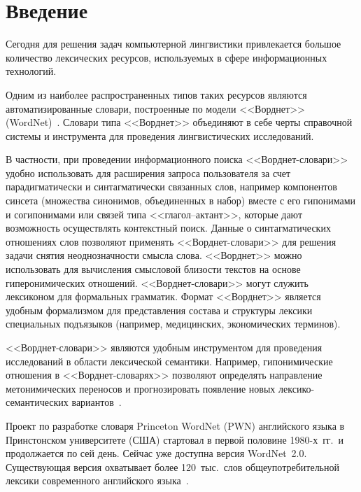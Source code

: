       \begin{multicols}{2}

      \label{st\stat}

\section{Введение}
     
     Сегодня для решения задач компьютерной лингвистики привлекается 
большое количество лексических ресурсов, используемых в сфере 
информационных технологий.
     
     Одним из наиболее распространенных типов таких ресурсов являются 
автоматизированные словари, построенные по модели <<Ворднет>> (WordNet)~\cite{1koz}. 
Словари типа <<Ворднет>> объединяют в себе черты справочной 
системы и инструмента для проведения лингвистических исследований.
     
     В частности, при проведении информационного поиска 
     <<Ворд\-нет-сло\-ва\-ри>> удобно использовать для расширения запроса 
пользователя за счет парадигматически и синтагматически связанных слов, 
например компонентов синсета (множества синонимов, объединенных в набор) 
вместе с его гипо\-ни\-ма\-ми и согипонимами или %
связей типа <<гла\-гол--ак\-тант>>, 
которые дают возможность осуществлять контекстный поиск. Данные о 
синтагматических отношениях слов позволяют применять 
     <<Ворд\-нет-сло\-ва\-ри>> для решения %
     задачи снятия неоднозначности 
смысла слова. <<Ворднет>> можно использовать для вычисления смысловой 
близости текстов на основе гиперонимических отношений. 
     <<Ворд\-нет-сло\-ва\-ри>> могут служить лексиконом для формальных 
грамматик. Формат <<Ворднет>> является удобным формализмом для 
представления соста\-ва и структуры %
лексики специальных подъязыков 
(например, медицинских, экономических тер\-минов). 
{

}
     
     <<Ворд\-нет-сло\-ва\-ри>> являются удобным инструментом для проведения 
исследований в об\-ласти лексической семантики. Например, гипонимические 
отношения в <<Ворд\-нет-сло\-ва\-рях>> позволяют определять направление 
метонимических переносов и прогнозировать появление новых лек\-си\-ко-се\-ман\-ти\-че\-ских вариантов~\cite{2koz}.
     
     Проект по разработке словаря Princeton WordNet (PWN) английского 
языка в Принстонском университете (США) стартовал в первой половине 
1980-х~гг.\  и продолжается по сей день. Сейчас уже доступна версия 
WordNet~2.0. Существующая версия охватывает более 120~тыс.\ слов 
общеупотребительной лексики современного английского языка~\cite{3koz}. 
     

\end{multicols}

